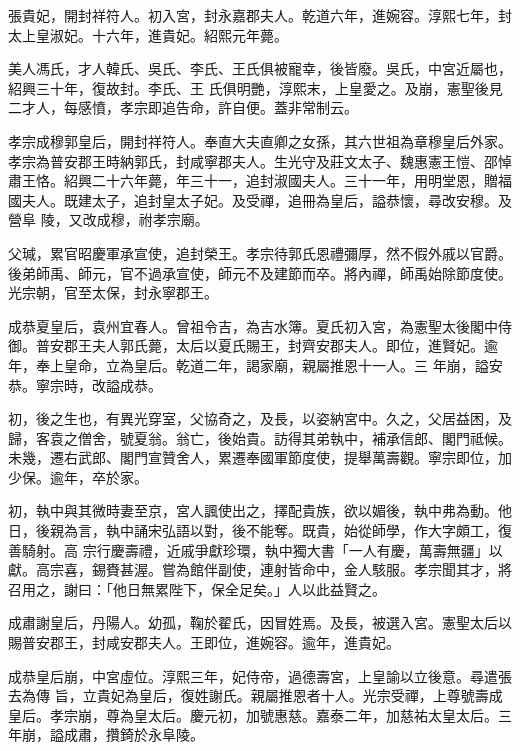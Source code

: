 \begin{pinyinscope}
 張貴妃，開封祥符人。初入宮，封永嘉郡夫人。乾道六年，進婉容。淳熙七年，封太上皇淑妃。十六年，進貴妃。紹熙元年薨。



 美人馮氏，才人韓氏、吳氏、李氏、王氏俱被寵幸，後皆廢。吳氏，中宮近屬也，紹興三十年，復故封。李氏、王
 氏俱明艷，淳熙末，上皇愛之。及崩，憲聖後見二才人，每感憤，孝宗即追告命，許自便。蓋非常制云。



 孝宗成穆郭皇后，開封祥符人。奉直大夫直卿之女孫，其六世祖為章穆皇后外家。孝宗為普安郡王時納郭氏，封咸寧郡夫人。生光守及莊文太子、魏惠憲王愷、邵悼肅王恪。紹興二十六年薨，年三十一，追封淑國夫人。三十一年，用明堂恩，贈福國夫人。既建太子，追封皇太子妃。及受禪，追冊為皇后，謚恭懷，尋改安穆。及營阜
 陵，又改成穆，祔孝宗廟。



 父瑊，累官昭慶軍承宣使，追封榮王。孝宗待郭氏恩禮彌厚，然不假外戚以官爵。後弟師禹、師元，官不過承宣使，師元不及建節而卒。將內禪，師禹始除節度使。光宗朝，官至太保，封永寧郡王。



 成恭夏皇后，袁州宜春人。曾祖令吉，為吉水簿。夏氏初入宮，為憲聖太後閣中侍御。普安郡王夫人郭氏薨，太后以夏氏賜王，封齊安郡夫人。即位，進賢妃。逾年，奉上皇命，立為皇后。乾道二年，謁家廟，親屬推恩十一人。三
 年崩，謚安恭。寧宗時，改謚成恭。



 初，後之生也，有異光穿室，父協奇之，及長，以姿納宮中。久之，父居益困，及歸，客袁之僧舍，號夏翁。翁亡，後始貴。訪得其弟執中，補承信郎、閣門祗候。未幾，遷右武郎、閣門宣贊舍人，累遷奉國軍節度使，提舉萬壽觀。寧宗即位，加少保。逾年，卒於家。



 初，執中與其微時妻至京，宮人諷使出之，擇配貴族，欲以媚後，執中弗為動。他日，後親為言，執中誦宋弘語以對，後不能奪。既貴，始從師學，作大字頗工，復善騎射。高
 宗行慶壽禮，近戚爭獻珍環，執中獨大書「一人有慶，萬壽無疆」以獻。高宗喜，錫賚甚渥。嘗為館伴副使，連射皆命中，金人駭服。孝宗聞其才，將召用之，謝曰：「他日無累陛下，保全足矣。」人以此益賢之。



 成肅謝皇后，丹陽人。幼孤，鞠於翟氏，因冒姓焉。及長，被選入宮。憲聖太后以賜普安郡王，封咸安郡夫人。王即位，進婉容。逾年，進貴妃。



 成恭皇后崩，中宮虛位。淳熙三年，妃侍帝，過德壽宮，上皇諭以立後意。尋遣張去為傳
 旨，立貴妃為皇后，復姓謝氏。親屬推恩者十人。光宗受禪，上尊號壽成皇后。孝宗崩，尊為皇太后。慶元初，加號惠慈。嘉泰二年，加慈祐太皇太后。三年崩，謚成肅，攢錡於永阜陵。




\end{pinyinscope}
